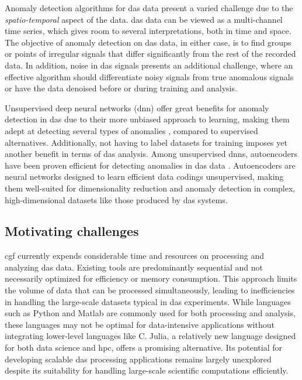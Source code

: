 Anomaly detection algorithms for \acrshort{das} data present a varied challenge due to the \textit{spatio-temporal} aspect of the data. \acrshort{das} data can be viewed as a multi-channel time series, which gives room to several interpretations, both in time and space. The objective of anomaly detection on \acrshort{das} data, in either case, is to find groups or points of irregular signals that differ significantly from the rest of the recorded data. In addition, noise in \acrshort{das} signals presents an additional challenge, where an effective algorithm should differentiate noisy signals from true anomalous signals or have the data denoised before or during training and analysis.

Unsupervised deep neural networks (\acrshort{dnn}) offer great benefits for anomaly detection in \acrshort{das} due to their more unbiased approach to learning, making them adept at detecting several types of anomalies \cite{wei2022lstmautoencoder, srivastava2016unsupervised}, compared to supervised alternatives. Additionally, not having to label datasets for training imposes yet another benefit in terms of \acrshort{das} analysis. Among unsupervised \acrshort{dnn}s, autoencoders have been proven efficient for detecting anomalies in \acrshort{das} data \cite{xie2023label}. Autoencoders are neural networks designed to learn efficient data codings unsupervised, making them well-suited for dimensionality reduction and anomaly detection in complex, high-dimensional datasets like those produced by \acrshort{das} systems. 

\subsection{Motivating challenges}

\acrfull{cgf} currently expends considerable time and resources on processing and analyzing \acrshort{das} data. Existing tools are predominantly sequential and not necessarily optimized for efficiency or memory consumption. This approach limits the volume of data that can be processed simultaneously, leading to inefficiencies in handling the large-scale datasets typical in \acrshort{das} experiments. 
While languages such as Python and Matlab are commonly used for both processing and analysis, these languages may not be optimal for data-intensive applications without integrating lower-level languages like C. Julia, a relatively new language designed for both data science and \acrfull{hpc}, offers a promising alternative. Its potential for developing scalable \acrshort{das} processing applications remains largely unexplored despite its suitability for handling large-scale scientific computations efficiently. 

